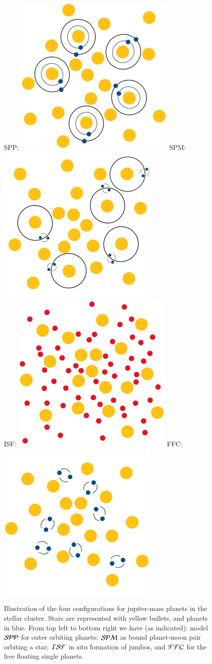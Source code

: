 \documentclass[submission,phys]{lib/SciPost}
\begin{document}
\begin{figure}
\begin{center}
SPP:    \includegraphics[width=0.3\columnwidth]{figures/Model_PP.jpg}
SPM:    ~\includegraphics[width=0.3\columnwidth]{figures/Model_PM.jpg}\\
ISF:    \includegraphics[width=0.3\columnwidth]{figures/Model_FFC.jpg}
FFC:    ~\includegraphics[width=0.3\columnwidth]{figures/Model_SF.jpg}
\caption{Illustration of the four configurations for jupiter-mass
  planets in the stellar cluster.  Stars are represented with yellow
  bullets, and planets in blue.  From top left to bottom right we have
  (as indicated): model ${\cal SPP}$ for outer orbiting planets;
  ${\cal SPM}$ as bound planet-moon pair orbiting a star; ${\cal ISF}$
  in situ formation of jumbos, and ${\cal FFC}$ for the free floating
  single planets.}
\label{Fig:models}
\end{center}
\end{figure}
  
\end{document}
